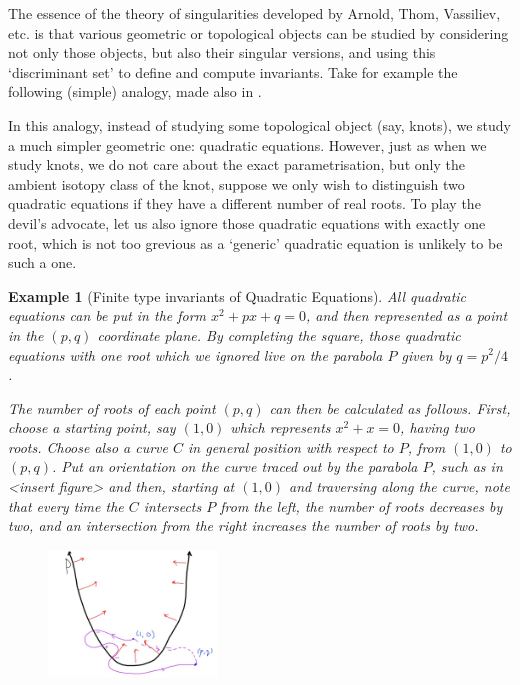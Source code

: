 \documentclass[12pt]{report}
\theoremstyle{regular}
\newtheorem{example}{Example}
\begin{document}
        The essence of the theory of singularities developed by Arnold, Thom, Vassiliev, etc. is that various geometric or topological objects can be studied by considering not only those objects, but also their singular versions, and using this `discriminant set' to define and compute invariants. Take for example the following (simple) analogy, made also in \cite{knots-links-and-their-invariants}.

        In this analogy, instead of studying some topological object (say, knots), we study a much simpler geometric one: quadratic equations. However, just as when we study knots, we do not care about the exact parametrisation, but only the ambient isotopy class of the knot, suppose we only wish to distinguish two quadratic equations if they have a different number of real roots. To play the devil's advocate, let us also ignore those quadratic equations with exactly one root, which is not too grevious as a `generic' quadratic equation is unlikely to be such a one.

        \begin{example}[Finite type invariants of Quadratic Equations]

                All quadratic equations can be put in the form \(x^{2} + px + q = 0\), and then represented as a point in the \((p, q)\) coordinate plane. By completing the square, those quadratic equations with one root which we ignored live on the parabola \(P\) given by \(q = p^{2}/4\).

                The number of roots of each point \((p, q)\) can then be calculated as follows. First, choose a starting point, say \((1, 0)\) which represents \(x^{2} + x = 0\), having two roots. Choose also a curve \(C\) in general position with respect to \(P\), from \((1, 0)\) to \((p, q)\). Put an orientation on the curve traced out by the parabola \(P\), such as in <insert figure> and then, starting at \((1, 0)\) and traversing along the curve, note that every time the \(C\) intersects \(P\) from the left, the number of roots decreases by two, and an intersection from the right increases the number of roots by two.

                \begin{figure}[H]
                        \centering
                        \includegraphics[width=0.4\textwidth]{graphics/parabola_example.jpg}
                \end{figure}

        \end{example}
\end{document}
